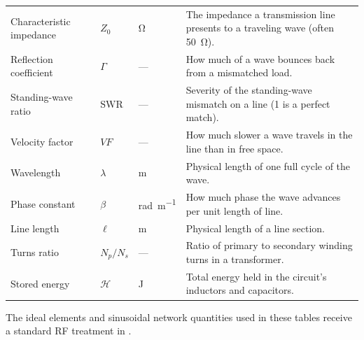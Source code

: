 \begin{longtable}{@{}L{0.22\textwidth}L{0.12\textwidth}L{0.16\textwidth}L{0.42\textwidth}@{}}
Characteristic impedance & \(Z_0\) & \si{\ohm} & The impedance a transmission line presents to a traveling wave (often \SI{50}{\ohm}). \\
Reflection coefficient & \(\Gamma\) & --- & How much of a wave bounces back from a mismatched load. \\
Standing-wave ratio & \(\mathrm{SWR}\) & --- & Severity of the standing-wave mismatch on a line (1 is a perfect match). \\
Velocity factor & \(VF\) & --- & How much slower a wave travels in the line than in free space. \\
Wavelength & \(\lambda\) & \si{\meter} & Physical length of one full cycle of the wave. \\
Phase constant & \(\beta\) & \si{\radian\per\meter} & How much phase the wave advances per unit length of line. \\
Line length & \(\ell\) & \si{\meter} & Physical length of a line section. \\
Turns ratio & \(N_p/N_s\) & --- & Ratio of primary to secondary winding turns in a transformer. \\
Stored energy & \(\mathcal{H}\) & \si{\joule} & Total energy held in the circuit's inductors and capacitors. \\
\bottomrule
\end{longtable}

The ideal elements and sinusoidal network quantities used in these tables receive a
standard RF treatment in \cite[pp.~16--32]{white2004highfrequency}.


